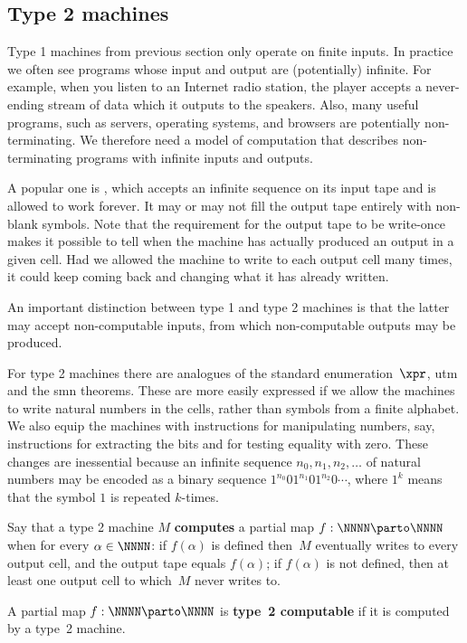 \subsection{Type 2 machines}
\label{sec:type-2}

Type 1 machines from previous section only operate on finite inputs.
In practice we often see programs whose input and output are
(potentially) infinite. For example, when you listen to an Internet
radio station, the player accepts a never-ending stream of data which
it outputs to the speakers. Also, many useful programs, such as servers, operating systems, and browsers are potentially non-terminating. We therefore need a model of computation that describes non-terminating programs with infinite inputs and outputs.

A popular one is , which accepts an
infinite sequence on its input tape and is allowed to work forever. It
may or may not fill the output tape entirely with non-blank symbols.
Note that the requirement for the output tape to be write-once makes
it possible to tell when the machine has actually produced an output
in a given cell. Had we allowed the machine to write to each output
cell many times, it could keep coming back and changing what it has
already written.

An important distinction between type 1 and type 2 machines is that
the latter may accept non-computable inputs, from which non-computable
outputs may be produced.

For type 2 machines there are analogues of the standard
enumeration~$\xpr$, utm and the smn theorems. These are more easily
expressed if we allow the machines to write natural numbers in the
cells, rather than symbols from a finite alphabet. We also equip the
machines with instructions for manipulating numbers, say, instructions
for extracting the bits and for testing equality with zero. These
changes are inessential because an infinite sequence $n_0, n_1, n_2,
\ldots$ of natural numbers may be encoded as a binary sequence
$1^{n_0}01^{n_1}01^{n_2}0\cdots$, where $1^k$ means that the symbol
$1$ is repeated $k$-times.

\begin{definition}
  Say that a type 2 machine $M$ \textbf{computes} a partial map $f : \NNNN \parto
  \NNNN$ when for every $\alpha \in \NNNN$:
  if $f(\alpha)$ is defined then~$M$ eventually writes to every output cell, and the output tape equals $f(\alpha)$; if $f(\alpha)$ is not defined, then at least one output cell to which~$M$ never writes to.

  A partial map $f : \NNNN \parto \NNNN$ is \textbf{type~2 computable} if it is computed by a type~2 machine.
\end{definition}

